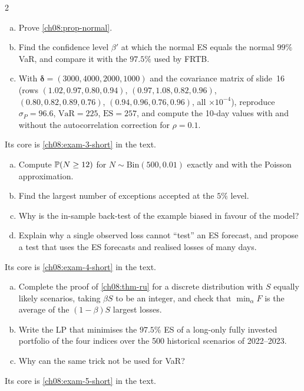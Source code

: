 \begin{paracol}{2}
\begin{exercise}\label{ch08:exam-3}
\leavevmode
\begin{enumerate}[(a)]
  \item Prove \cref{ch08:prop-normal}.
  \item Find the confidence level $\beta'$ at which the normal ES equals the normal
      $99\%$ VaR, and compare it with the $97.5\%$ used by FRTB.
  \item With $\bm\delta=(3000,4000,2000,1000)$ and the covariance
      matrix of slide~16 (rows $(1.02,0.97,0.80,0.94)$, $(0.97,1.08,0.82,0.96)$, $(0.80,0.82,0.89,0.76)$,
      $(0.94,0.96,0.76,0.96)$, all $\times10^{-4}$), reproduce $\sigma_P=96.6$, $\mathrm{VaR}=225$, $\mathrm{ES}=257$, and
      compute the 10-day values with and without the autocorrelation correction for $\rho=0.1$.
\end{enumerate}
Its core is \cref{ch08:exam-3-short} in the text.
\end{exercise}

\begin{exercise}\label{ch08:exam-4}
\leavevmode
\begin{enumerate}[(a)]
  \item Compute $\mathbb{P}(N\ge12)$ for $N\sim\mathrm{Bin}(500,0.01)$ exactly and with the Poisson approximation.
  \item Find the
      largest number of exceptions accepted at the $5\%$ level.
  \item Why is the in-sample back-test of the example biased in
      favour of the model?
  \item Explain why a single observed loss cannot ``test'' an ES forecast, and propose a test that
      uses the ES forecasts and realised losses of many days.
\end{enumerate}
Its core is \cref{ch08:exam-4-short} in the text.
\end{exercise}

\begin{exercise}\label{ch08:exam-5}
\leavevmode
\begin{enumerate}[(a)]
  \item Complete the proof of \cref{ch08:thm-ru} for a discrete distribution with $S$ equally likely scenarios, taking
      $\beta S$ to be an integer, and check that $\min_\alpha F$ is the average of the $(1-\beta)S$ largest losses.
  \item Write the LP that minimises the $97.5\%$ ES of a long-only fully invested portfolio of the four indices over the
      500 historical scenarios of 2022--2023.
  \item Why can the same trick not be used for VaR?
\end{enumerate}
Its core is \cref{ch08:exam-5-short} in the text.
\end{exercise}


\end{paracol}
